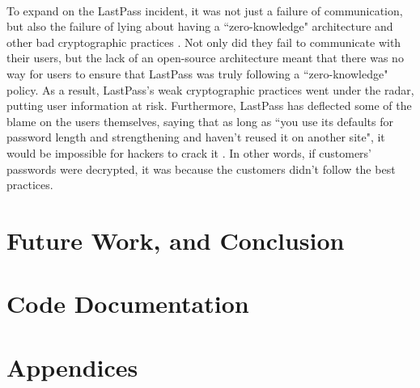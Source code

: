 \documentclass[10pt,twocolumn]{article}
\begin{document}
\paragraph{}
To expand on the LastPass incident, it was not just a failure of communication, but also the failure of lying about having a ``zero-knowledge" architecture and other bad cryptographic practices \cite{clark_2022}. Not only did they fail to communicate with their users, but the lack of an open-source architecture meant that there was no way for users to ensure that LastPass was truly following a ``zero-knowledge" policy. As a result, LastPass's weak cryptographic practices went under the radar, putting user information at risk. Furthermore, LastPass has deflected some of the blame on the users themselves, saying that as long as ``you use its defaults for password length and strengthening and haven't reused it on another site", it would be impossible for hackers to crack it \cite{clark_2022}. In other words, if customers' passwords were decrypted, it was because the customers didn't follow the best practices. 
\section{Future Work, and Conclusion}


\section{Code Documentation}


\section{Appendices}


\printbibliography
\end{document}

